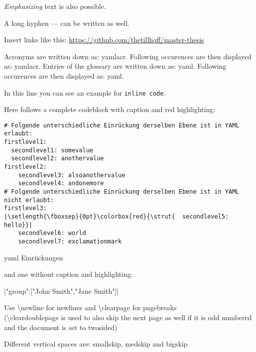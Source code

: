 \emph{Emphasizing} text is also possible.

A long hyphen --- can be written as well.

Insert links like this: \url{https://github.com/thetillhoff/master-thesis}

Acronyms are written down as: \gls{yamlacr}. Following occurences are then displayed as: \gls{yamlacr}.
\newline
Entries of the glossary are written down as: \gls{yaml}. Following occurences are then displayed as: \gls{yaml}.

In this line you can see an example for \texttt{inline code}.

Here follows a complete codeblock with caption and red highlighting:

\begin{listing}[H]\begin{addmargin}[2em]{2em}\begin{verbatim}
# Folgende unterschiedliche Einrückung derselben Ebene ist in YAML erlaubt:
firstlevel1:
  secondlevel1: somevalue
  secondlevel2: anothervalue
firstlevel2:
    secondlevel3: alsoanothervalue
    secondlevel4: andonemore
# Folgende unterschiedliche Einrückung derselben Ebene ist in YAML nicht erlaubt:
firstlevel3:
|\setlength{\fboxsep}{0pt}\colorbox{red}{\strut{  secondlevel5: hello}}|
    secondlevel6: world
    secondlevel7: exclamationmark
\end{verbatim}
\caption{\gls{yaml} Einrückungen}
\label{code:yamlindentation}
\end{addmargin}
\end{listing}

and one without caption and highlighting:
\begin{addmargin}[2em]{2em}
|"group":["John Smith","Jane Smith"]|
\end{addmargin}

Use \newline \textbackslash newline for newlines and \clearpage \textbackslash clearpage for pagebreaks \\
(\textbackslash cleardoublepage is used to also skip the next page as well if it is odd numbered and the document is set to twosided)

Different vertical spaces are:
\newline\smallskip
smallskip,
\newline\medskip
medskip and
\newline\bigskip
bigskip

